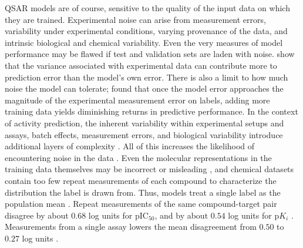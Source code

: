 QSAR models are of course, sensitive to the quality of the input data on which they are trained. Experimental noise can arise from measurement errors, variability under experimental conditions, varying provenance of the data, and intrinsic biological and chemical variability. Even the very measures of model performance may be flawed if test and validation sets are laden with noise. \citet{Kolmar2021} show that the variance associated with experimental data can contribute more to prediction error than the model’s own error. There is also a limit to how much noise the model can tolerate; \citet{jorner2021} found that once the model error approaches the magnitude of the experimental measurement error on labels, adding more training data yields diminishing returns in predictive performance. In the context of activity prediction, the inherent variability within experimental setups and assays, batch effects, measurement errors, and biological variability introduce additional layers of complexity \citep{Kolmar2021, Fourches2010}. All of this increases the likelihood of encountering noise in the data \citep{Fang2022}. Even the molecular representations in the training data themselves may be incorrect or misleading \citep{Walters2023}, and chemical datasets contain too few repeat measurements of each compound to characterize the distribution the label is drawn from. Thus, models treat a single label as the population mean \citep{Kolmar2021}. Repeat measurements of the same compound-target pair disagree by about $0.68$ log units for pIC$_{50}$, and by about $0.54$ log units for p$K_i$ \citep{Kalliokoski2013, Kramer2012}. Measurements from a single assay lowers the mean disagreement from $0.50$ to $0.27$ log units \citep{landrum2024}.  


